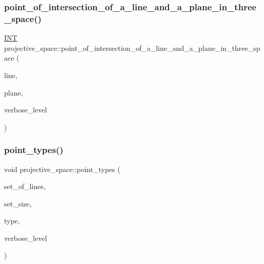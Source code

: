 \mbox{\label{classprojective__space_ac43301e2e6d9e5d77c2730271b11cb66}} 
\subsubsection{\texorpdfstring{point\+\_\+of\+\_\+intersection\+\_\+of\+\_\+a\+\_\+line\+\_\+and\+\_\+a\+\_\+plane\+\_\+in\+\_\+three\+\_\+space()}{point\_of\_intersection\_of\_a\_line\_and\_a\_plane\_in\_three\_space()}}
{\footnotesize\ttfamily \mbox{\hyperlink{galois_8h_a09fddde158a3a20bd2dcadb609de11dc}{I\+NT}} projective\+\_\+space\+::point\+\_\+of\+\_\+intersection\+\_\+of\+\_\+a\+\_\+line\+\_\+and\+\_\+a\+\_\+plane\+\_\+in\+\_\+three\+\_\+space (\begin{DoxyParamCaption}\item[{\mbox{\hyperlink{galois_8h_a09fddde158a3a20bd2dcadb609de11dc}{I\+NT}}}]{line,  }\item[{\mbox{\hyperlink{galois_8h_a09fddde158a3a20bd2dcadb609de11dc}{I\+NT}}}]{plane,  }\item[{\mbox{\hyperlink{galois_8h_a09fddde158a3a20bd2dcadb609de11dc}{I\+NT}}}]{verbose\+\_\+level }\end{DoxyParamCaption})}

\mbox{\label{classprojective__space_ae0509908cd8e3d14945da54ccb6c7e33}} 
\subsubsection{\texorpdfstring{point\+\_\+types()}{point\_types()}}
{\footnotesize\ttfamily void projective\+\_\+space\+::point\+\_\+types (\begin{DoxyParamCaption}\item[{\mbox{\hyperlink{galois_8h_a09fddde158a3a20bd2dcadb609de11dc}{I\+NT}} $\ast$}]{set\+\_\+of\+\_\+lines,  }\item[{\mbox{\hyperlink{galois_8h_a09fddde158a3a20bd2dcadb609de11dc}{I\+NT}}}]{set\+\_\+size,  }\item[{\mbox{\hyperlink{galois_8h_a09fddde158a3a20bd2dcadb609de11dc}{I\+NT}} $\ast$}]{type,  }\item[{\mbox{\hyperlink{galois_8h_a09fddde158a3a20bd2dcadb609de11dc}{I\+NT}}}]{verbose\+\_\+level }\end{DoxyParamCaption})}

